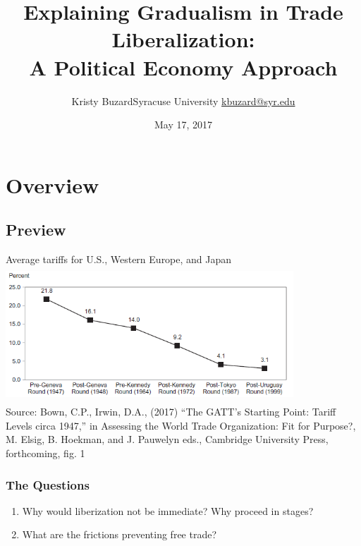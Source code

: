 \documentclass{beamer}
\title[Explaining Gradualism in Trade Liberalization \hspace{2.5in}\insertframenumber/\inserttotalframenumber]{Explaining Gradualism in Trade Liberalization: \\A Political Economy Approach}
\author[Kristy Buzard]{\texorpdfstring{Kristy Buzard\newline Syracuse University  \newline\url{kbuzard@syr.edu}}{Kristy Buzard}}
\date{May 17, 2017}
\begin{document}
\maketitle




\section{Overview}
\subsection{Preview}

\begin{frame}{Average tariffs for U.S., Western Europe, and Japan}
	\includegraphics[height=2in, width=4.25in]{linegraph-Bown-Irwin.png} \\
	\scriptsize Source: Bown, C.P., Irwin, D.A., (2017) ``The GATT's Starting Point: Tariff Levels circa 1947,'' in Assessing the World Trade Organization: Fit for Purpose?, M. Elsig, B. Hoekman, and J. Pauwelyn eds., Cambridge University Press, forthcoming, fig. 1
\end{frame}

\begin{frame}
\frametitle{The Questions}
\pause
\begin{enumerate}[<+->]
	\item Why would liberization not be immediate? Why proceed in stages?
  \item What are the frictions preventing free trade? %
\end{enumerate}
\end{frame}
\end{document}
